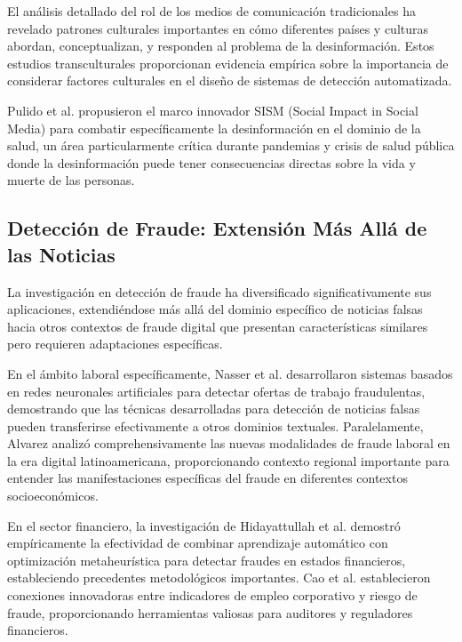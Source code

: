 El análisis detallado del rol de los medios de comunicación tradicionales \cite{carcamo2021fake, perez2020fake} ha revelado patrones culturales importantes en cómo diferentes países y culturas abordan, conceptualizan, y responden al problema de la desinformación. Estos estudios transculturales proporcionan evidencia empírica sobre la importancia de considerar factores culturales en el diseño de sistemas de detección automatizada.

Pulido et al. \cite{pulido2020new} propusieron el marco innovador SISM (Social Impact in Social Media) para combatir específicamente la desinformación en el dominio de la salud, un área particularmente crítica durante pandemias y crisis de salud pública donde la desinformación puede tener consecuencias directas sobre la vida y muerte de las personas.

\subsection{Detección de Fraude: Extensión Más Allá de las Noticias}

La investigación en detección de fraude ha diversificado significativamente sus aplicaciones, extendiéndose más allá del dominio específico de noticias falsas hacia otros contextos de fraude digital que presentan características similares pero requieren adaptaciones específicas.

En el ámbito laboral específicamente, Nasser et al. \cite{nasser2021online} desarrollaron sistemas basados en redes neuronales artificiales para detectar ofertas de trabajo fraudulentas, demostrando que las técnicas desarrolladas para detección de noticias falsas pueden transferirse efectivamente a otros dominios textuales. Paralelamente, Alvarez \cite{alvarez2021fraude} analizó comprehensivamente las nuevas modalidades de fraude laboral en la era digital latinoamericana, proporcionando contexto regional importante para entender las manifestaciones específicas del fraude en diferentes contextos socioeconómicos.

En el sector financiero, la investigación de Hidayattullah et al. \cite{hidayattullah2020financial} demostró empíricamente la efectividad de combinar aprendizaje automático con optimización metaheurística para detectar fraudes en estados financieros, estableciendo precedentes metodológicos importantes. Cao et al. \cite{cao2020corporate} establecieron conexiones innovadoras entre indicadores de empleo corporativo y riesgo de fraude, proporcionando herramientas valiosas para auditores y reguladores financieros.


